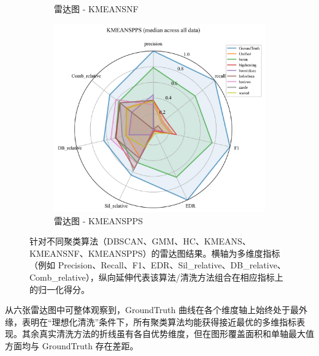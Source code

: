 \documentclass[10pt]{article} %
\numberwithin{equation}{section}
\begin{document}
\begin{enumerate}[label=(\alph*)]
\begin{figure}[htbp]
\begin{subfigure}[b]{0.30\linewidth}
        \caption{雷达图 - KMEANSNF}
        \label{fig:radar_kmeansnf}
    \end{subfigure}
    \hfill
    \begin{subfigure}[b]{0.30\linewidth}
        \centering
        \includegraphics[width=\linewidth]{figures/radar graph/radar_KMEANSPPS.pdf}
        \caption{雷达图 - KMEANSPPS}
        \label{fig:radar_kmeanspps}
    \end{subfigure}

    \caption{针对不同聚类算法（DBSCAN、GMM、HC、KMEANS、KMEANSNF、KMEANSPPS）的雷达图结果。横轴为多维度指标（例如 Precision、Recall、F1、EDR、Sil\_relative、DB\_relative、Comb\_relative），纵向延伸代表该算法/清洗方法组合在相应指标上的归一化得分。}
    \label{fig:all_radar_charts}
\end{figure}

从六张雷达图中可整体观察到，GroundTruth 曲线在各个维度轴上始终处于最外缘，表明在“理想化清洗”条件下，所有聚类算法均能获得接近最优的多维指标表现。其余真实清洗方法的折线虽有各自优势维度，但在图形覆盖面积和单轴最大值方面均与 GroundTruth 存在差距。


\end{enumerate}
\end{document}
